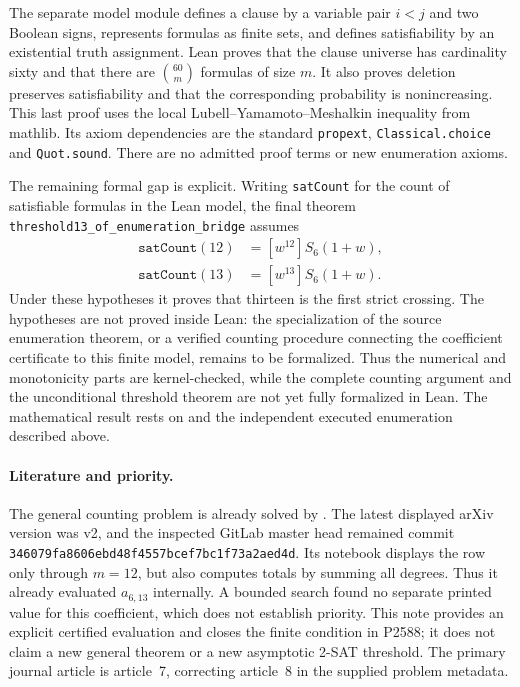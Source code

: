 \documentclass[11pt,a4paper]{article}
\newcommand{\coeff}[1]{\left[#1\right]}
\begin{document}
The separate model module defines a clause by a variable pair $i<j$ and two
Boolean signs, represents formulas as finite sets, and defines satisfiability
by an existential truth assignment. Lean proves that the clause universe has
cardinality sixty and that there are $\binom{60}{m}$ formulas of size $m$.
It also proves deletion preserves satisfiability and that the corresponding
probability is nonincreasing. This last proof uses the local
Lubell--Yamamoto--Meshalkin inequality from mathlib. Its axiom dependencies are
the standard \texttt{propext}, \texttt{Classical.choice} and \texttt{Quot.sound}.
There are no admitted proof terms or new enumeration axioms.

The remaining formal gap is explicit. Writing \texttt{satCount} for the count
of satisfiable formulas in the Lean model, the final theorem
\texttt{threshold13\_of\_enumeration\_bridge} assumes
\[
\begin{split}
\texttt{satCount}(12)&=\coeff{w^{12}}S_6(1+w),\\
\texttt{satCount}(13)&=\coeff{w^{13}}S_6(1+w).
\end{split}
\]
Under these hypotheses it proves that thirteen is the first strict crossing.
The hypotheses are not proved inside Lean: the specialization of the source
enumeration theorem, or a verified counting procedure connecting the coefficient
certificate to this finite model, remains to be formalized. Thus the numerical
and monotonicity parts are kernel-checked, while the complete counting argument
and the unconditional threshold theorem are not yet fully formalized in Lean.
The mathematical result rests on \cite{DPR} and the independent executed
enumeration described above.

\paragraph{Literature and priority.}
The general counting problem is already solved by \cite{DPR}. The latest
displayed arXiv version was v2, and the inspected GitLab master head remained
commit \texttt{346079fa8606ebd48f4557bcef7bc1f73a2aed4d}. Its notebook displays
the row only through $m=12$, but also computes totals by summing all degrees.
Thus it already evaluated $a_{6,13}$ internally. A bounded search found no separate
printed value for this coefficient, which does not establish priority. This note
provides an explicit certified evaluation and closes the finite condition in
P2588; it does not claim a new general theorem or a new asymptotic 2-SAT threshold.
The primary journal article is article~7, correcting article~8 in the supplied
problem metadata.
\end{document}
